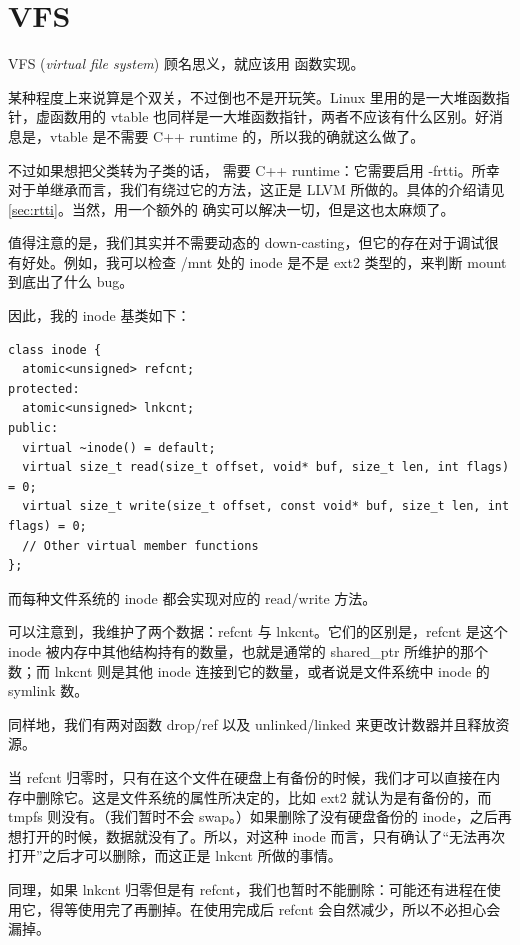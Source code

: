 \section{VFS}
\label{sec:vfs}

VFS (\textit{virtual file system}) 顾名思义，就应该用  函数实现。

某种程度上来说算是个双关，不过倒也不是开玩笑。Linux 里用的是一大堆函数指针，虚函数用的 vtable 也同样是一大堆函数指针，两者不应该有什么区别。好消息是，vtable 是不需要 C++ runtime 的，所以我的确就这么做了。

不过如果想把父类转为子类的话，  需要 C++ runtime：它需要启用 -frtti。所幸对于单继承而言，我们有绕过它的方法，这正是 LLVM 所做的。具体的介绍请见 \cref{sec:rtti}。当然，用一个额外的  确实可以解决一切，但是这也太麻烦了。

值得注意的是，我们其实并不需要动态的 down-casting，但它的存在对于调试很有好处。例如，我可以检查 /mnt 处的 inode 是不是 ext2 类型的，来判断 mount 到底出了什么 bug。

因此，我的 inode 基类如下：
\begin{verbatim}
class inode {
  atomic<unsigned> refcnt;
protected:
  atomic<unsigned> lnkcnt;
public:
  virtual ~inode() = default;
  virtual size_t read(size_t offset, void* buf, size_t len, int flags) = 0;
  virtual size_t write(size_t offset, const void* buf, size_t len, int flags) = 0;
  // Other virtual member functions
};
\end{verbatim}

而每种文件系统的 inode 都会实现对应的 read/write 方法。

可以注意到，我维护了两个数据：refcnt 与 lnkcnt。它们的区别是，refcnt 是这个 inode 被内存中其他结构持有的数量，也就是通常的 shared\_ptr 所维护的那个数；而 lnkcnt 则是其他 inode 连接到它的数量，或者说是文件系统中 inode 的 symlink 数。

同样地，我们有两对函数 drop/ref 以及 unlinked/linked 来更改计数器并且释放资源。

当 refcnt 归零时，只有在这个文件在硬盘上有备份的时候，我们才可以直接在内存中删除它。这是文件系统的属性所决定的，比如 ext2 就认为是有备份的，而 tmpfs 则没有。（我们暂时不会 swap。）如果删除了没有硬盘备份的 inode，之后再想打开的时候，数据就没有了。所以，对这种 inode 而言，只有确认了“无法再次打开”之后才可以删除，而这正是 lnkcnt 所做的事情。

同理，如果 lnkcnt 归零但是有 refcnt，我们也暂时不能删除：可能还有进程在使用它，得等使用完了再删掉。在使用完成后 refcnt 会自然减少，所以不必担心会漏掉。

